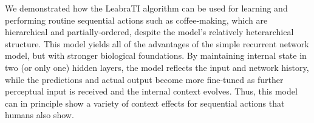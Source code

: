 \documentclass[10pt,letterpaper]{article}
\numberwithin{equation}{section}
\begin{document}
We demonstrated how the LeabraTI algorithm can be used for learning and performing routine sequential actions such as coffee-making, which are hierarchical and partially-ordered, despite the model's relatively heterarchical structure. This model yields all of the advantages of the  simple recurrent network model, but with stronger biological foundations. By maintaining internal state in two (or only one) hidden layers, the model reflects the input and network history, while the predictions and actual output become more fine-tuned as further perceptual input is received and the internal context evolves. Thus, this model can in principle show a variety of context effects for sequential actions that humans also show. 



\end{document}
